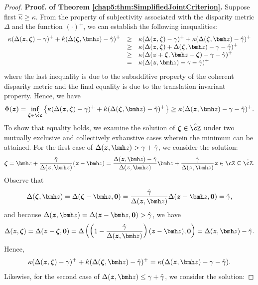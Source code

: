\documentclass[opre, blindrev]{informs4}
\newcommand{\1}[1]{\mathds{1}{\left(#1\right)}}
\begin{document}
\begin{appendices}
\begin{proof}{\bf Proof. of Theorem \ref{chap5:thm:SimplifiedJointCriterion}.}
Suppose first $\hat \kappa \geq \kappa$. From the property of subjectivity associated with the disparity metric $\Delta$ and the function $(\cdot)^+$, we can establish the following inequalities:
$$
\begin{array}{rcl}
\displaystyle \kappa (  \Delta(\bm z,\bm \zeta) - \gamma)^+ + \hat \kappa ( \Delta(\bm \zeta,\bmh z) - \hat \gamma)^+ 
&\geq&  \displaystyle \kappa (  \Delta(\bm z,\bm \zeta) - \gamma)^+ +  \kappa ( \Delta(\bm \zeta,\bmh z) - \hat \gamma)^+\\
&\geq&  \displaystyle \kappa ( \Delta(\bm z,\bm \zeta) + \Delta(\bm \zeta,\bmh z) - \gamma - \hat \gamma)^+ \\
&\geq&  \displaystyle \kappa ( \Delta(\bm z+\bm \zeta,\bmh z+ \bm \zeta) - \gamma - \hat \gamma)^+ \\
&=&  \displaystyle \kappa ( \Delta(\bm{z},\bmh z) - \gamma - \hat \gamma)^+ 
\end{array}
$$
where the last inequality is due to the subadditive property of the coherent disparity metric and the final equality is due to the translation invariant property. Hence, we have 
$$
\Phi(\bm z) = \inf_{\bm \zeta  \in  \hat \cZ} \left\{ \kappa (  \Delta(\bm z,\bm \zeta) - \gamma)^+ + \hat \kappa ( \Delta(\bm \zeta,\bmh z) - \hat \gamma)^+ \right\} \geq  \kappa( \Delta(\bm z,\bmh z) - \gamma -\hat \gamma)^+.
$$
To show that equality holds, we examine the solution of $\bm \zeta  \in  \hat \cZ$ under two mutually exclusive and collectively exhaustive cases wherein the minimum can be attained. For the first case of $\Delta(\bm z,\bmh z)> \gamma + \hat \gamma$, we consider the solution:
$$
\bm \zeta = \bmh z + \frac{\hat \gamma}{\Delta(\bm z,\bmh z)}(\bm z - \bmh z) = \frac{\Delta(\bm z,\bmh z) - \hat \gamma}{\Delta(\bm z,\bmh z)}\bmh z +  \frac{\hat \gamma}{\Delta(\bm z,\bmh z)}\bm z \in \cZ \subseteq \hat \cZ. 
$$
Observe that 
$$
\Delta(\bm \zeta,\bmh z) = \Delta(\bm \zeta-\bmh z,\bm 0) = \frac{\hat \gamma}{\Delta(\bm z,\bmh z)}  \Delta(\bm z-\bmh z,\bm 0) =  \hat \gamma,
$$
and because $\Delta(\bm z,\bmh z)=\Delta(\bm z-\bmh z,\bm 0)> \hat \gamma$, we have 
$$
\Delta(\bm z,\bm \zeta)= \Delta(\bm z - \bm \zeta, \bm 0) = \Delta\left( \left( 1- \frac{\hat \gamma}{\Delta(\bm z,\bmh z)}\right)(\bm z - \bmh z),\bm 0\right) = \Delta(\bm z,\bmh z) - \hat \gamma.
$$
Hence,
$$
\kappa (  \Delta(\bm z,\bm \zeta) - \gamma)^+ + \hat \kappa ( \Delta(\bm \zeta,\bmh z) - \hat \gamma)^+ =  \kappa( \Delta(\bm z,\bmh z) - \gamma -\hat \gamma). 
$$
Likewise, for the second case of $\Delta(\bm z,\bmh z)\leq \gamma + \hat \gamma$, we consider the solution:

\end{proof}
\end{appendices}
\end{document}
